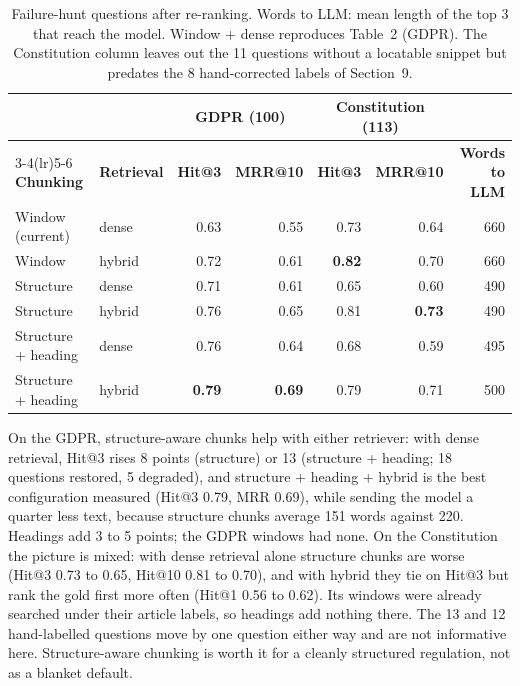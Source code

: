 \documentclass[10pt,a4paper]{article}
\begin{document}
\begin{table}[!htbp]
\centering\small
\begin{tabular}{@{}llrrrrr@{}}
\toprule
 & & \multicolumn{2}{c}{\textbf{GDPR (100)}} & \multicolumn{2}{c}{\textbf{Constitution (113)}} & \\
\cmidrule(lr){3-4}\cmidrule(lr){5-6}
\textbf{Chunking} & \textbf{Retrieval} & \textbf{Hit@3} & \textbf{MRR@10} & \textbf{Hit@3} & \textbf{MRR@10} & \textbf{Words to LLM} \\
\midrule
Window (current)    & dense  & 0.63 & 0.55 & 0.73 & 0.64 & 660 \\
Window              & hybrid & 0.72 & 0.61 & \textbf{0.82} & 0.70 & 660 \\
Structure           & dense  & 0.71 & 0.61 & 0.65 & 0.60 & 490 \\
Structure           & hybrid & 0.76 & 0.65 & 0.81 & \textbf{0.73} & 490 \\
Structure + heading & dense  & 0.76 & 0.64 & 0.68 & 0.59 & 495 \\
Structure + heading & hybrid & \textbf{0.79} & \textbf{0.69} & 0.79 & 0.71 & 500 \\
\bottomrule
\end{tabular}
\caption{Failure-hunt questions after re-ranking. Words to LLM: mean length of the top 3 that reach the model.
Window + dense reproduces Table~2 (GDPR). The Constitution column leaves out the 11 questions without a locatable
snippet but predates the 8 hand-corrected labels of Section~9.}
\end{table}

On the GDPR, structure-aware chunks help with either retriever: with dense retrieval, Hit@3 rises 8 points
(structure) or 13 (structure + heading; 18 questions restored, 5 degraded), and structure + heading + hybrid is the best configuration measured (Hit@3 0.79, MRR 0.69),
while sending the model a quarter less text, because structure chunks average 151 words against 220. Headings add
3 to 5 points; the GDPR windows had none. On the Constitution the picture is mixed: with dense retrieval alone
structure chunks are worse (Hit@3 0.73 to 0.65, Hit@10 0.81 to 0.70), and with hybrid they tie on Hit@3 but rank
the gold first more often (Hit@1 0.56 to 0.62). Its windows were already searched under their article labels, so
headings add nothing there. The 13 and 12 hand-labelled questions move by one question either way and are not
informative here. Structure-aware chunking is worth it for a cleanly structured regulation, not as a blanket
default.
\end{document}
